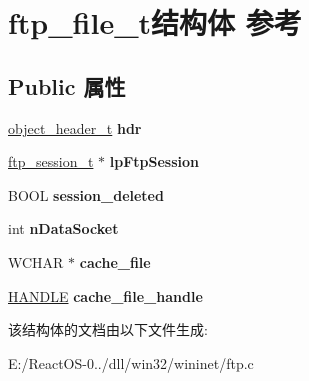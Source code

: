 \hypertarget{structftp__file__t}{}\section{ftp\+\_\+file\+\_\+t结构体 参考}
\label{structftp__file__t}
\subsection*{Public 属性}
\begin{DoxyCompactItemize}
\item 
\mbox{\label{structftp__file__t_ac58a556757e14840db2137b754c73a67}} 
\hyperlink{struct__object__header__t}{object\+\_\+header\+\_\+t} {\bfseries hdr}
\item 
\mbox{\label{structftp__file__t_a2a1a3886fccef9954cbed3bed096f851}} 
\hyperlink{struct__ftp__session__t}{ftp\+\_\+session\+\_\+t} $\ast$ {\bfseries lp\+Ftp\+Session}
\item 
\mbox{\label{structftp__file__t_a16209d3f1de21bb26885cabdd9645ffb}} 
B\+O\+OL {\bfseries session\+\_\+deleted}
\item 
\mbox{\label{structftp__file__t_a393097887ed4954994b7e0fb91b27576}} 
int {\bfseries n\+Data\+Socket}
\item 
\mbox{\label{structftp__file__t_a0e0363af7f06f3d062f2b2fe2c0ead71}} 
W\+C\+H\+AR $\ast$ {\bfseries cache\+\_\+file}
\item 
\mbox{\label{structftp__file__t_a2e75968cfd04871fae6ef9d3aaa5fd44}} 
\hyperlink{interfacevoid}{H\+A\+N\+D\+LE} {\bfseries cache\+\_\+file\+\_\+handle}
\end{DoxyCompactItemize}


该结构体的文档由以下文件生成\+:\begin{DoxyCompactItemize}
\item 
E\+:/\+React\+O\+S-\/0../dll/win32/wininet/ftp.\+c\end{DoxyCompactItemize}
